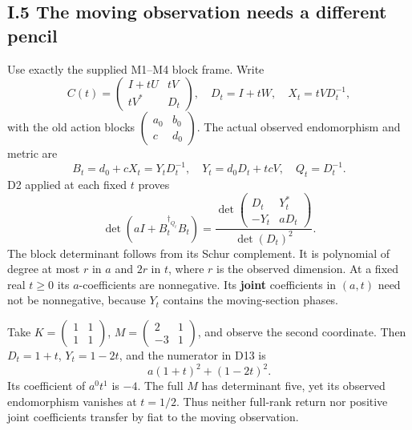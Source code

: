 \documentclass[11pt]{article}
\begin{document}
\subsection{I.5 The moving observation needs a different pencil}\label{i.5-the-moving-observation-needs-a-different-pencil}

Use exactly the supplied M1--M4 block frame. Write \[
 C(t)=\begin{pmatrix}I+tU&tV\\tV^*&D_t\end{pmatrix},\quad D_t=I+tW,
\quad X_t=tVD_t^{-1},
\] with the old action blocks \(\left(\begin{smallmatrix}a_0&b_0\\c&d_0\end{smallmatrix}\right)\). The actual observed endomorphism and metric are \[
 B_t=d_0+cX_t=Y_tD_t^{-1},\quad
 Y_t=d_0D_t+t cV,\quad Q_t=D_t^{-1}.
\] D2 applied at each fixed \(t\) proves \[
 \boxed{\det(aI+B_t^{\dagger_{Q_t}}B_t)
 =\frac{\det\begin{pmatrix}D_t&Y_t^*\\-Y_t&aD_t\end{pmatrix}}
              {\det(D_t)^2}.}
 \tag{D13}
\] The block determinant follows from its Schur complement. It is polynomial of degree at most \(r\) in \(a\) and \(2r\) in \(t\), where \(r\) is the observed dimension. At a fixed real \(t\ge0\) its \(a\)-coefficients are nonnegative. Its \textbf{joint} coefficients in \((a,t)\) need not be nonnegative, because \(Y_t\) contains the moving-section phases.

Take \(K=\left(\begin{smallmatrix}1&1\\1&1\end{smallmatrix}\right)\), \(M=\left(\begin{smallmatrix}2&1\\-3&1\end{smallmatrix}\right)\), and observe the second coordinate. Then \(D_t=1+t\), \(Y_t=1-2t\), and the numerator in D13 is \[
 a(1+t)^2+(1-2t)^2.
 \tag{D14}
\] Its coefficient of \(a^0t^1\) is \(-4\). The full \(M\) has determinant five, yet its observed endomorphism vanishes at \(t=1/2\). Thus neither full-rank return nor positive joint coefficients transfer by fiat to the moving observation.
\end{document}
